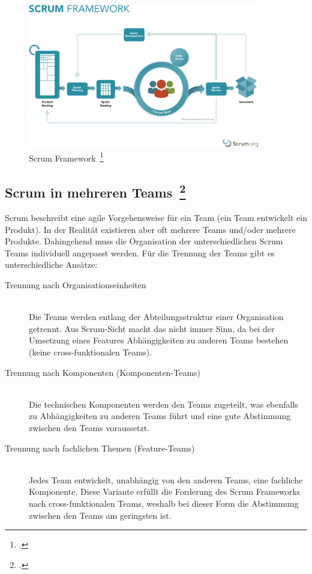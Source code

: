 \begin{savenotes}
  \begin{figure}[H] 
    \centering
       \includegraphics[width=0.9\textwidth]{img/scrum-framework.png}
    \caption[Scrum Framework]{Scrum Framework~\footcite{scrum_framework}}\label{fig:scrum_framework}
  \end{figure}
\end{savenotes}

\subsection[Scrum in mehreren Teams]{Scrum in mehreren Teams~\footcite[vgl.][S.172ff]{scrum_kurz_gut_2013}}

Scrum beschreibt eine agile Vorgehensweise für ein Team (ein Team entwickelt ein Produkt).
In der Realität existieren aber oft mehrere Teams und/oder mehrere Produkte. 
Dahingehend muss die Organisation der unterschiedlichen Scrum Teams individuell angepasst werden.
Für die Trennung der Teams gibt es unterschiedliche Ansätze:
\begin{description}
  \item[Trennung nach Organisationseinheiten] \hfill \\ Die Teams werden entlang der Abteilungsstruktur einer Organisation getrennt. Aus Scrum-Sicht macht das nicht immer Sinn, da bei der Umsetzung eines Features Abhängigkeiten zu anderen Teams bestehen (keine cross-funktionalen Teams).
  \item[Trennung nach Komponenten (Komponenten-Teams)] \hfill \\ Die technischen Komponenten werden den Teams zugeteilt, was ebenfalls zu Abhängigkeiten zu anderen Teams führt und eine gute Abstimmung zwischen den Teams voraussetzt.
  \item[Trennung nach fachlichen Themen (Feature-Teams)] \hfill \\ Jedes Team entwickelt, unabhängig von den anderen Teams, eine fachliche Komponente. Diese Variante erfüllt die Forderung des Scrum Frameworks nach cross-funktionalen Teams, weshalb bei dieser Form die Abstimmung zwischen den Teams am geringsten ist.
\end{description}

